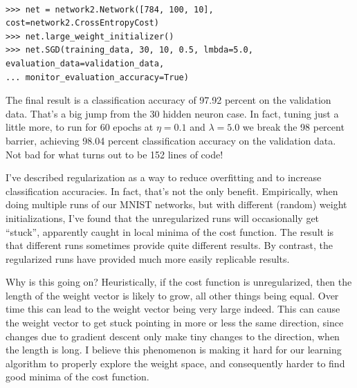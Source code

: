\documentclass[a4paper,twoside,10pt]{book}
\begin{document}
\begin{lstlisting}

>>> net = network2.Network([784, 100, 10], cost=network2.CrossEntropyCost)
>>> net.large_weight_initializer()
>>> net.SGD(training_data, 30, 10, 0.5, lmbda=5.0, evaluation_data=validation_data,
... monitor_evaluation_accuracy=True)

\end{lstlisting}
The final result is a classification accuracy of 97.92 percent on the validation data. That's a big jump from the 30 hidden neuron case. In fact, tuning just a little more, to run for 60 epochs at $\eta=0.1$ and $\lambda =5.0$ we break the 98 percent barrier, achieving 98.04 percent classification accuracy on the validation data. Not bad for what turns out to be 152 lines of code!

I've described regularization as a way to reduce overfitting and to increase classification accuracies. In fact, that's not the only benefit. Empirically, when doing multiple runs of our MNIST networks, but with different (random) weight initializations, I've found that the unregularized runs will occasionally get ``stuck'', apparently caught in local minima of the cost function. The result is that different runs sometimes provide quite different results. By contrast, the regularized runs have provided much more easily replicable results.

Why is this going on? Heuristically, if the cost function is unregularized, then the length of the weight vector is likely to grow, all other things being equal. Over time this can lead to the weight vector being very large indeed. This can cause the weight vector to get stuck pointing in more or less the same direction, since changes due to gradient descent only make tiny changes to the direction, when the length is long. I believe this phenomenon is making it hard for our learning algorithm to properly explore the weight space, and consequently harder to find good minima of the cost function.
\end{document}
